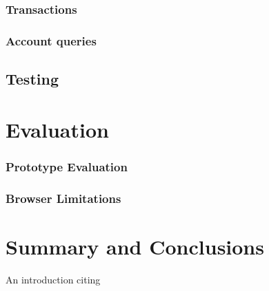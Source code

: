 \documentclass[a4paper]{article}
\begin{document}
\subsubsection{Transactions}
\subsubsection{Account queries}

\subsection{Testing}

\section{Evaluation}
\subsubsection{Prototype Evaluation}
\subsubsection{Browser Limitations}


\section{Summary and Conclusions}




An introduction citing \cite{someauthor}



\end{document}

